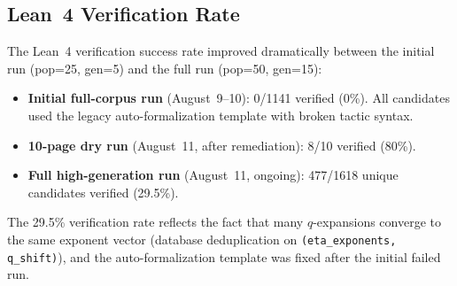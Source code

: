 \subsection{Lean~4 Verification Rate}

The Lean~4 verification success rate improved dramatically
between the initial run (pop=25, gen=5) and the full run
(pop=50, gen=15):
\begin{itemize}
  \item \textbf{Initial full-corpus run} (August~9--10):
        0/1141 verified (0\%).  All candidates used the
        legacy auto-formalization template with broken
        tactic syntax.
  \item \textbf{10-page dry run} (August~11, after
        remediation): 8/10 verified (80\%).
  \item \textbf{Full high-generation run} (August~11,
        ongoing): 477/1618 unique candidates verified
        (29.5\%).
\end{itemize}

The 29.5\% verification rate reflects the fact that many
$q$-expansions converge to the same exponent vector
(database deduplication on \texttt{(eta\_exponents, q\_shift)}),
and the auto-formalization template was fixed after the
initial failed run.
